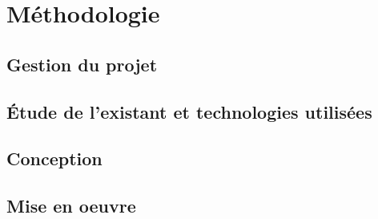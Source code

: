 \chapter{Méthodologie}
\lipsum  %


\section{Gestion du projet}

\lipsum  %


\section{Étude de l'existant et technologies utilisées}

\lipsum  %


\section{Conception}

\lipsum  %


\section{Mise en oeuvre}

\lipsum  %

